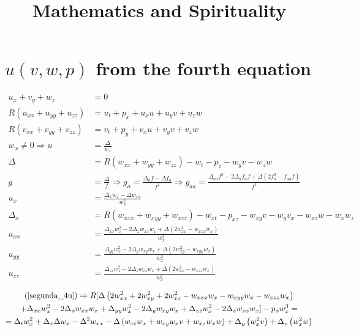 \documentclass[12pt,a4paper]{article}
\title{Mathematics and Spirituality}
\date{}
\begin{document}
	\maketitle

	\tableofcontents
	\addtocontents{}{\protect\rule{\textwidth}{.2pt}\par}

	\section{$u(v,w,p)$ from the fourth equation}

	\begin{align}
	  u_x + v_y + w_z &= 0 \label{primeira_4u} \\
	  R \left(u_{xx} + u_{yy} + u_{zz} \right) &= u_t + p_x + u_x u + u_y v + u_z w \label{segunda_4u} \\
	  R \left(v_{xx} + v_{yy} + v_{zz} \right) &= v_t + p_y + v_x u + v_y v + v_z w \label{terceira_4u} \\
	  w_x \neq 0 \Rightarrow u &= \frac{\Delta}{w_x} \\
	  \Delta &= R \left(w_{xx} + w_{yy} + w_{zz} \right) - w_t - p_z - w_y v - w_z w \label{delta_4u} \\
	  g &= \frac{\Delta}{f} \Rightarrow g_a = \frac{\Delta_a f - \Delta f_a}{f^2} \Rightarrow g_{aa} = \frac{\Delta_{aa} f^2 - 2 \Delta_a f_a f + \Delta \left( 2 f_a^2 - f_{aa} f \right)}{f^3} \label{g} \\
	  u_x &= \frac{\Delta_x w_x - \Delta w_{xx}}{w_x^2} \\
	  \Delta_x &= R \left(w_{xxx} + w_{xyy} + w_{xzz} \right) - w_{xt} - p_{xz} - w_{xy} v - w_y v_x - w_{xz} w - w_x w_z \\
	  u_{xx} &= \frac{\Delta_{xx} w_x^2 - 2\Delta_x w_{xx} w_x + \Delta \left( 2w_{xx}^2 - w_{xxx} w_x \right)}{w_x^3} \\
	  u_{yy} &= \frac{\Delta_{yy} w_x^2 - 2\Delta_y w_{xy} w_x + \Delta \left( 2w_{xy}^2 - w_{xyy} w_x \right)}{w_x^3} \\
	  u_{zz} &= \frac{\Delta_{zz} w_x^2 - 2\Delta_z w_{xz} w_x + \Delta \left( 2w_{xz}^2 - w_{xzz} w_x \right)}{w_x^3}
	\end{align}

	\begin{multline}
    (\ref{segunda_4u}) \Rightarrow R [\Delta \left( 2 w_{xx}^2 + 2 w_{xy}^2 + 2 w_{xz}^2 - w_{xxx}w_x - w_{xyy} w_x - w_{xzz} w_x \right) \\
    + \Delta_{xx} w_x^2 - 2\Delta_x w_{xx} w_x + \Delta_{yy} w_x^2 - 2\Delta_y w_{xy} w_x + \Delta_{zz} w_x^2 - 2\Delta_z w_{xz} w_x ] - p_x w_x^3 = \\
    = \Delta_t w_x^2 + \Delta_x \Delta w_x - \Delta^2 w_{xx} - \Delta \left(w_{xt} w_x + w_{xy} w_x v + w_{xz} w_x w \right) + \Delta_y \left(w_x^2 v \right) + \Delta_z \left(w_x^2 w \right) \label{complicada_4u}
	\end{multline}
\end{document}
